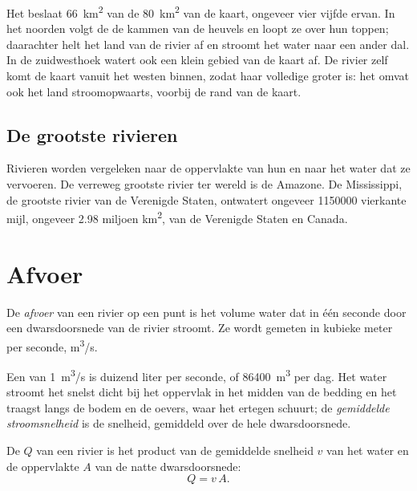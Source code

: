 Het  beslaat \qty{66}{km^2} van de \qty{80}{km^2} van de kaart,
ongeveer vier vijfde ervan. In het noorden volgt de  de kammen van
de heuvels en loopt ze over hun toppen; daarachter helt het land van de rivier af
en stroomt het water naar een ander dal. In de zuidwesthoek watert ook een klein
gebied van de kaart af. De rivier zelf komt de kaart vanuit het westen binnen,
zodat haar volledige  groter is: het omvat ook het land
stroomopwaarts, voorbij de rand van de kaart.

\subsection*{De grootste rivieren}

Rivieren worden vergeleken naar de oppervlakte van hun  en naar het
water dat ze vervoeren. De verreweg grootste rivier ter wereld is de Amazone. De
Mississippi, de grootste rivier van de Verenigde Staten, ontwatert ongeveer
\num{1150000} vierkante mijl, ongeveer 2.98 miljoen \unit{km^2}, van de Verenigde
Staten en Canada.

\section{Afvoer}

\begin{definition}[Afvoer]\label{def:g10:drainage-basins:discharge}
De \emph{afvoer} van een rivier op een punt is het volume water dat
in één seconde door een dwarsdoorsnede van de rivier stroomt. Ze wordt gemeten
in kubieke meter per seconde, \unit{m^3/s}.
\end{definition}

Een  van \qty{1}{m^3/s} is duizend liter per seconde, of
\qty{86400}{m^3} per dag. Het water stroomt het snelst dicht bij het oppervlak
in het midden van de bedding en het traagst langs de bodem en de oevers, waar het
ertegen schuurt; de \emph{gemiddelde stroomsnelheid} is de snelheid, gemiddeld
over de hele dwarsdoorsnede.

\begin{proposition}\label{prop:g10:drainage-basins:discharge}
De  $Q$ van een rivier is het product van de gemiddelde snelheid $v$ van
het water en de oppervlakte $A$ van de natte dwarsdoorsnede:
\[
Q = v\,A.
\]
\end{proposition}

